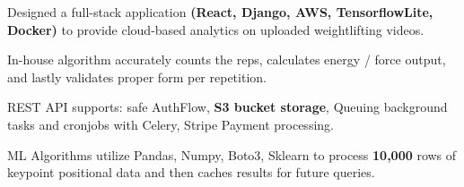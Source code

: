 

\begin{cventries}

  \cventry
    {
    } %
    {} %
    {} %
    {} %
    {
      \begin{cvitems} %
        \item {Designed a full-stack application \textbf{(React, Django, AWS, TensorflowLite, Docker)} to provide cloud-based analytics on uploaded weightlifting videos.}
        \item{In-house algorithm accurately counts the reps, calculates energy / force output, and lastly validates proper form per repetition.}
        \item{REST API supports: safe AuthFlow, \textbf{S3 bucket storage}, Queuing background tasks and cronjobs with Celery, Stripe Payment processing.}
        \item{ML Algorithms utilize Pandas, Numpy, Boto3, Sklearn to process \textbf{10,000} rows of keypoint positional data and then caches results for future queries.}
      \end{cvitems}
    }



\end{cventries}

